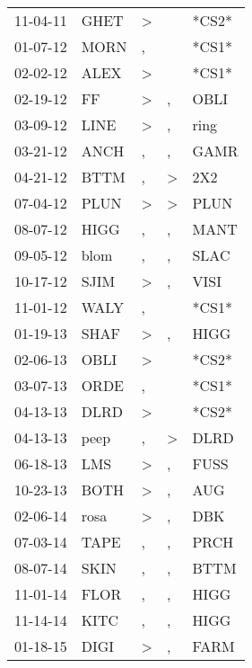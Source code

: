 \begin{supertabular}{lllll}
 11-04-11 &   GHET &     \textgreater &               &  *CS2* \\
 01-07-12 &   MORN &                , &               &  *CS1* \\
 02-02-12 &   ALEX &     \textgreater &               &  *CS1* \\
 02-19-12 &     FF &     \textgreater &             , &   OBLI \\
 03-09-12 &   LINE &     \textgreater &             , &   ring \\
 03-21-12 &   ANCH &                , &             , &   GAMR \\
 04-21-12 &   BTTM &                , &  \textgreater &    2X2 \\
 07-04-12 &   PLUN &     \textgreater &  \textgreater &   PLUN \\
 08-07-12 &   HIGG &                , &             , &   MANT \\
 09-05-12 &   blom &                , &             , &   SLAC \\
 10-17-12 &   SJIM &     \textgreater &             , &   VISI \\
 11-01-12 &   WALY &                , &               &  *CS1* \\
 01-19-13 &   SHAF &     \textgreater &             , &   HIGG \\
 02-06-13 &   OBLI &     \textgreater &               &  *CS2* \\
 03-07-13 &   ORDE &                , &               &  *CS1* \\
 04-13-13 &   DLRD &     \textgreater &               &  *CS2* \\
 04-13-13 &   peep &                , &  \textgreater &   DLRD \\
 06-18-13 &    LMS &     \textgreater &             , &   FUSS \\
 10-23-13 &   BOTH &     \textgreater &             , &    AUG \\
 02-06-14 &   rosa &     \textgreater &             , &    DBK \\
 07-03-14 &   TAPE &                , &             , &   PRCH \\
 08-07-14 &   SKIN &                , &             , &   BTTM \\
 11-01-14 &   FLOR &                , &             , &   HIGG \\
 11-14-14 &   KITC &                , &             , &   HIGG \\
 01-18-15 &   DIGI &     \textgreater &             , &   FARM \\

\end{supertabular}

